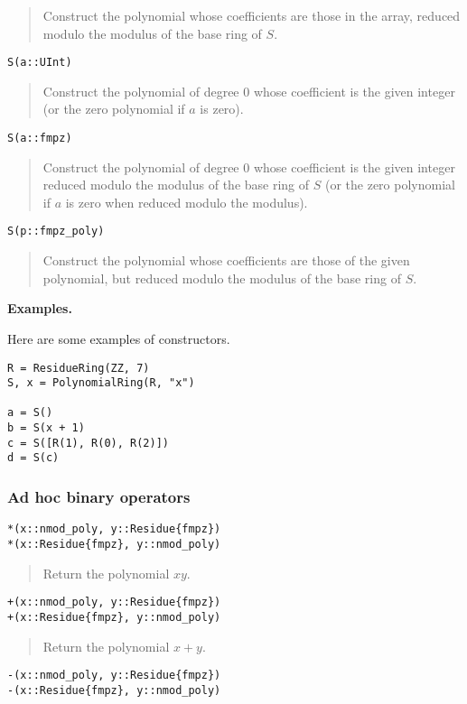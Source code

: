 \documentclass[a4paper,10pt]{article}
\newcommand{\desc}[1]{\vspace{-3mm}\begin{quote}#1\end{quote}}
\begin{document}
{{\desc{Construct the polynomial whose coefficients are those in the array, reduced modulo the
modulus of the base ring of $S$.}

\begin{lstlisting}
S(a::UInt)
\end{lstlisting}

\desc{Construct the polynomial of degree $0$ whose coefficient is the given integer (or the
zero polynomial if $a$ is zero).}

\begin{lstlisting}
S(a::fmpz)
\end{lstlisting}

\desc{Construct the polynomial of degree $0$ whose coefficient is the given integer reduced
modulo the modulus of the base ring of $S$ (or the zero polynomial if $a$ is zero when
reduced modulo the modulus).}

\begin{lstlisting}
S(p::fmpz_poly)
\end{lstlisting}

\desc{Construct the polynomial whose coefficients are those of the given polynomial, but
reduced modulo the modulus of the base ring of $S$.}

\textbf{Examples.}

Here are some examples of constructors.

\begin{lstlisting}
R = ResidueRing(ZZ, 7)
S, x = PolynomialRing(R, "x")

a = S()
b = S(x + 1)
c = S([R(1), R(0), R(2)])
d = S(c)
\end{lstlisting}

\subsubsection{Ad hoc binary operators}

\begin{lstlisting}
*(x::nmod_poly, y::Residue{fmpz})
*(x::Residue{fmpz}, y::nmod_poly)
\end{lstlisting}

\desc{Return the polynomial $xy$.}

\begin{lstlisting}
+(x::nmod_poly, y::Residue{fmpz})
+(x::Residue{fmpz}, y::nmod_poly)
\end{lstlisting}

\desc{Return the polynomial $x + y$.}

\begin{lstlisting}
-(x::nmod_poly, y::Residue{fmpz})
-(x::Residue{fmpz}, y::nmod_poly)
\end{lstlisting}

}}
\end{document}
